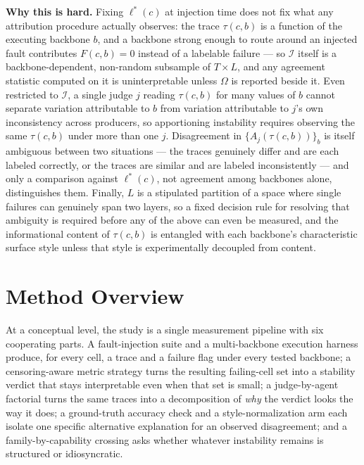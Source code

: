 \documentclass[11pt]{article}
\begin{document}
\noindent\textbf{Why this is hard.} Fixing $\ell^*(c)$ at injection time does not fix what any attribution procedure actually observes: the trace $\tau(c,b)$ is a function of the executing backbone $b$, and a backbone strong enough to route around an injected fault contributes $F(c,b)=0$ instead of a labelable failure --- so $\mathcal{I}$ itself is a backbone-dependent, non-random subsample of $T\times L$, and any agreement statistic computed on it is uninterpretable unless $\Omega$ is reported beside it. Even restricted to $\mathcal{I}$, a single judge $j$ reading $\tau(c,b)$ for many values of $b$ cannot separate variation attributable to $b$ from variation attributable to $j$'s own inconsistency across producers, so apportioning instability requires observing the same $\tau(c,b)$ under more than one $j$. Disagreement in $\{A_j(\tau(c,b))\}_{b}$ is itself ambiguous between two situations --- the traces genuinely differ and are each labeled correctly, or the traces are similar and are labeled inconsistently --- and only a comparison against $\ell^*(c)$, not agreement among backbones alone, distinguishes them. Finally, $L$ is a stipulated partition of a space where single failures can genuinely span two layers, so a fixed decision rule for resolving that ambiguity is required before any of the above can even be measured, and the informational content of $\tau(c,b)$ is entangled with each backbone's characteristic surface style unless that style is experimentally decoupled from content.

\section{Method Overview}

At a conceptual level, the study is a single measurement pipeline with six cooperating parts. A fault-injection suite and a multi-backbone execution harness produce, for every cell, a trace and a failure flag under every tested backbone; a censoring-aware metric strategy turns the resulting failing-cell set into a stability verdict that stays interpretable even when that set is small; a judge-by-agent factorial turns the same traces into a decomposition of \emph{why} the verdict looks the way it does; a ground-truth accuracy check and a style-normalization arm each isolate one specific alternative explanation for an observed disagreement; and a family-by-capability crossing asks whether whatever instability remains is structured or idiosyncratic.
\end{document}
